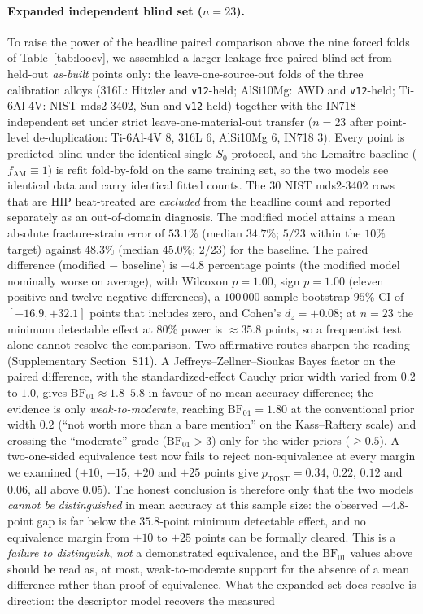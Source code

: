 \documentclass[12pt,a4paper,twocolumn]{article}
\begin{document}
\paragraph{Expanded independent blind set ($n = 23$).} To raise the power of the headline paired comparison above the nine forced folds of Table~\ref{tab:loocv}, we assembled a larger leakage-free paired blind set from held-out \emph{as-built} points only: the leave-one-source-out folds of the three calibration alloys (316L: Hitzler and \texttt{v12}-held; AlSi10Mg: AWD and \texttt{v12}-held; Ti-6Al-4V: NIST mds2-3402, Sun and \texttt{v12}-held) together with the IN718 independent set under strict leave-one-material-out transfer ($n = 23$ after point-level de-duplication: Ti-6Al-4V 8, 316L 6, AlSi10Mg 6, IN718 3). Every point is predicted blind under the identical single-$S_0$ protocol, and the Lemaitre baseline ($f_{\mathrm{AM}} \equiv 1$) is refit fold-by-fold on the same training set, so the two models see identical data and carry identical fitted counts. The 30 NIST mds2-3402 rows that are HIP heat-treated are \emph{excluded} from the headline count and reported separately as an out-of-domain diagnosis. The modified model attains a mean absolute fracture-strain error of $53.1\%$ (median $34.7\%$; $5/23$ within the $10\%$ target) against $48.3\%$ (median $45.0\%$; $2/23$) for the baseline. The paired difference (modified $-$ baseline) is $+4.8$ percentage points (the modified model nominally worse on average), with Wilcoxon $p = 1.00$, sign $p = 1.00$ (eleven positive and twelve negative differences), a $100\,000$-sample bootstrap $95\%$ CI of $[-16.9, +32.1]$ points that includes zero, and Cohen's $d_z = +0.08$; at $n = 23$ the minimum detectable effect at $80\%$ power is $\approx 35.8$ points, so a frequentist test alone cannot resolve the comparison. Two affirmative routes sharpen the reading (Supplementary Section~S11). A Jeffreys--Zellner--Sioukas Bayes factor on the paired difference, with the standardized-effect Cauchy prior width varied from $0.2$ to $1.0$, gives $\mathrm{BF}_{01}\approx1.8$--$5.8$ in favour of no mean-accuracy difference; the evidence is only \emph{weak-to-moderate}, reaching $\mathrm{BF}_{01}=1.80$ at the conventional prior width $0.2$ (``not worth more than a bare mention'' on the Kass--Raftery scale) and crossing the ``moderate'' grade ($\mathrm{BF}_{01}>3$) only for the wider priors ($\ge0.5$). A two-one-sided equivalence test now fails to reject non-equivalence at every margin we examined ($\pm10$, $\pm15$, $\pm20$ and $\pm25$ points give $p_{\mathrm{TOST}}=0.34$, $0.22$, $0.12$ and $0.06$, all above $0.05$). The honest conclusion is therefore only that the two models \emph{cannot be distinguished} in mean accuracy at this sample size: the observed $+4.8$-point gap is far below the $35.8$-point minimum detectable effect, and no equivalence margin from $\pm10$ to $\pm25$ points can be formally cleared. This is a \emph{failure to distinguish}, \emph{not} a demonstrated equivalence, and the $\mathrm{BF}_{01}$ values above should be read as, at most, weak-to-moderate support for the absence of a mean difference rather than proof of equivalence. What the expanded set does resolve is direction: the descriptor model recovers the measured 
\end{document}
